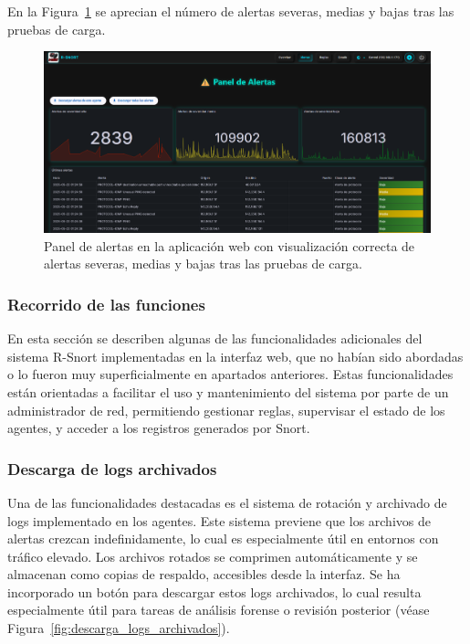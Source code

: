 \documentclass[11pt,a4paper,twoside]{report}
\begin{document}
En la Figura~\ref{fig:alertas_masivas_webapp} se aprecian el número de alertas severas, medias y bajas tras las pruebas de carga.

\begin{figure}[H]
	\centering
	\includegraphics[width=1\textwidth]{pruebas/2.png}
	\caption{Panel de alertas en la aplicación web con visualización correcta de alertas severas, medias y bajas tras las pruebas de carga.}
	\label{fig:alertas_masivas_webapp}
\end{figure}

\subsubsection{Recorrido de las funciones}
\label{sec:funcionamiento}

En esta sección se describen algunas de las funcionalidades adicionales del sistema R-Snort implementadas en la interfaz web, que no habían sido abordadas o lo fueron muy superficialmente en apartados anteriores. Estas funcionalidades están orientadas a facilitar el uso y mantenimiento del sistema por parte de un administrador de red, permitiendo gestionar reglas, supervisar el estado de los agentes, y acceder a los registros generados por Snort.

\subsubsection{Descarga de logs archivados}

Una de las funcionalidades destacadas es el sistema de rotación y archivado de logs implementado en los agentes. Este sistema previene que los archivos de alertas crezcan indefinidamente, lo cual es especialmente útil en entornos con tráfico elevado. Los archivos rotados se comprimen automáticamente y se almacenan como copias de respaldo, accesibles desde la interfaz. Se ha incorporado un botón para descargar estos logs archivados, lo cual resulta especialmente útil para tareas de análisis forense o revisión posterior (véase Figura~\ref{fig:descarga_logs_archivados}).
\end{document}
